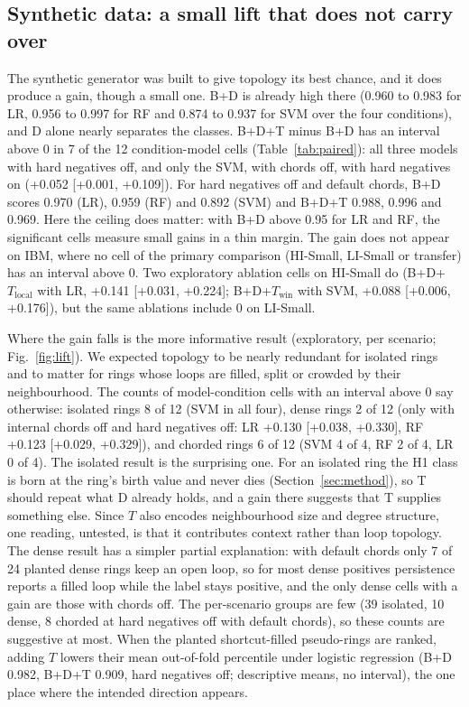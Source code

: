 \documentclass[conference]{IEEEtran}
\begin{document}
\subsection{Synthetic data: a small lift that does not carry over}
The synthetic generator was built to give topology its best chance, and it does produce a gain, though a small one. B+D is already high there (0.960 to 0.983 for LR, 0.956 to 0.997 for RF and 0.874 to 0.937 for SVM over the four conditions), and D alone nearly separates the classes. B+D+T minus B+D has an interval above 0 in 7 of the 12 condition-model cells (Table~\ref{tab:paired}): all three models with hard negatives off, and only the SVM, with chords off, with hard negatives on (+0.052 [+0.001, +0.109]). For hard negatives off and default chords, B+D scores 0.970 (LR), 0.959 (RF) and 0.892 (SVM) and B+D+T 0.988, 0.996 and 0.969. Here the ceiling does matter: with B+D above 0.95 for LR and RF, the significant cells measure small gains in a thin margin. The gain does not appear on IBM, where no cell of the primary comparison (HI-Small, LI-Small or transfer) has an interval above 0. Two exploratory ablation cells on HI-Small do (B+D+$T_{\mathrm{local}}$ with LR, +0.141 [+0.031, +0.224]; B+D+$T_{\mathrm{win}}$ with SVM, +0.088 [+0.006, +0.176]), but the same ablations include 0 on LI-Small.

Where the gain falls is the more informative result (exploratory, per scenario; Fig.~\ref{fig:lift}). We expected topology to be nearly redundant for isolated rings and to matter for rings whose loops are filled, split or crowded by their neighbourhood. The counts of model-condition cells with an interval above 0 say otherwise: isolated rings 8 of 12 (SVM in all four), dense rings 2 of 12 (only with internal chords off and hard negatives off: LR +0.130 [+0.038, +0.330], RF +0.123 [+0.029, +0.329]), and chorded rings 6 of 12 (SVM 4 of 4, RF 2 of 4, LR 0 of 4). The isolated result is the surprising one. For an isolated ring the H1 class is born at the ring's birth value and never dies (Section~\ref{sec:method}), so T should repeat what D already holds, and a gain there suggests that T supplies something else. Since $T$ also encodes neighbourhood size and degree structure, one reading, untested, is that it contributes context rather than loop topology. The dense result has a simpler partial explanation: with default chords only 7 of 24 planted dense rings keep an open loop, so for most dense positives persistence reports a filled loop while the label stays positive, and the only dense cells with a gain are those with chords off. The per-scenario groups are few (39 isolated, 10 dense, 8 chorded at hard negatives off with default chords), so these counts are suggestive at most. When the planted shortcut-filled pseudo-rings are ranked, adding $T$ lowers their mean out-of-fold percentile under logistic regression (B+D 0.982, B+D+T 0.909, hard negatives off; descriptive means, no interval), the one place where the intended direction appears.
\end{document}
